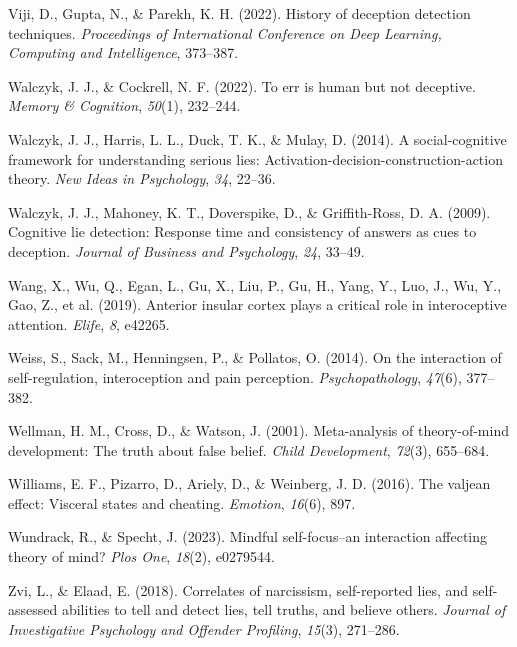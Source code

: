 \documentclass[
  man,mask,floatsintext]{apa6}
\newlength{\cslhangindent}
\newenvironment{CSLReferences}[2] %
 {\begin{list}{}{%
  \setlength{\itemindent}{0pt}
  \setlength{\leftmargin}{0pt}
  \setlength{\parsep}{0pt}
  \ifodd #1
   \setlength{\leftmargin}{\cslhangindent}
   \setlength{\itemindent}{-1\cslhangindent}
  \fi
  \setlength{\itemsep}{#2\baselineskip}}}
 {\end{list}}
\begin{document}
\begin{CSLReferences}{1}{0}
Viji, D., Gupta, N., \& Parekh, K. H. (2022). History of deception detection techniques. \emph{Proceedings of International Conference on Deep Learning, Computing and Intelligence}, 373--387.

Walczyk, J. J., \& Cockrell, N. F. (2022). To err is human but not deceptive. \emph{Memory \& Cognition}, \emph{50}(1), 232--244.

Walczyk, J. J., Harris, L. L., Duck, T. K., \& Mulay, D. (2014). A social-cognitive framework for understanding serious lies: Activation-decision-construction-action theory. \emph{New Ideas in Psychology}, \emph{34}, 22--36.

Walczyk, J. J., Mahoney, K. T., Doverspike, D., \& Griffith-Ross, D. A. (2009). Cognitive lie detection: Response time and consistency of answers as cues to deception. \emph{Journal of Business and Psychology}, \emph{24}, 33--49.

Wang, X., Wu, Q., Egan, L., Gu, X., Liu, P., Gu, H., Yang, Y., Luo, J., Wu, Y., Gao, Z., et al. (2019). Anterior insular cortex plays a critical role in interoceptive attention. \emph{Elife}, \emph{8}, e42265.

Weiss, S., Sack, M., Henningsen, P., \& Pollatos, O. (2014). On the interaction of self-regulation, interoception and pain perception. \emph{Psychopathology}, \emph{47}(6), 377--382.

Wellman, H. M., Cross, D., \& Watson, J. (2001). Meta-analysis of theory-of-mind development: The truth about false belief. \emph{Child Development}, \emph{72}(3), 655--684.

Williams, E. F., Pizarro, D., Ariely, D., \& Weinberg, J. D. (2016). The valjean effect: Visceral states and cheating. \emph{Emotion}, \emph{16}(6), 897.

Wundrack, R., \& Specht, J. (2023). Mindful self-focus--an interaction affecting theory of mind? \emph{Plos One}, \emph{18}(2), e0279544.

Zvi, L., \& Elaad, E. (2018). Correlates of narcissism, self-reported lies, and self-assessed abilities to tell and detect lies, tell truths, and believe others. \emph{Journal of Investigative Psychology and Offender Profiling}, \emph{15}(3), 271--286.

\end{CSLReferences}

\endgroup
\end{document}
